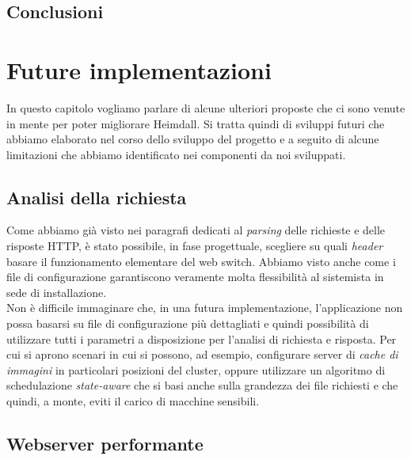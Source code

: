 \documentclass[italian]{tktltiki2}
\begin{document}
\subsection{Conclusioni}
\newpage
\section{Future implementazioni}
In questo capitolo vogliamo parlare di alcune ulteriori proposte che ci sono venute in mente per poter migliorare Heimdall. Si tratta quindi di sviluppi futuri che abbiamo elaborato nel corso dello sviluppo del progetto e a seguito di alcune limitazioni che abbiamo identificato nei componenti da noi sviluppati.
\subsection{Analisi della richiesta}
Come abbiamo già visto nei paragrafi dedicati al \emph{parsing} delle richieste e delle risposte HTTP, è stato possibile, in fase progettuale, scegliere su quali \emph{header} basare il funzionamento elementare del web switch. Abbiamo visto anche come i file di configurazione garantiscono veramente molta flessibilità al sistemista in sede di installazione. \\
Non è difficile immaginare che, in una futura implementazione, l'applicazione non possa basarsi su file di configurazione più dettagliati e quindi possibilità di utilizzare tutti i parametri a disposizione per l'analisi di richiesta e risposta. Per cui si aprono scenari in cui si possono, ad esempio, configurare server di \emph{cache di immagini} in particolari posizioni del cluster, oppure utilizzare un algoritmo di schedulazione \emph{state-aware} che si basi anche sulla grandezza dei file richiesti e che quindi, a monte, eviti il carico di macchine sensibili.
\subsection{Webserver performante}
\end{document}
